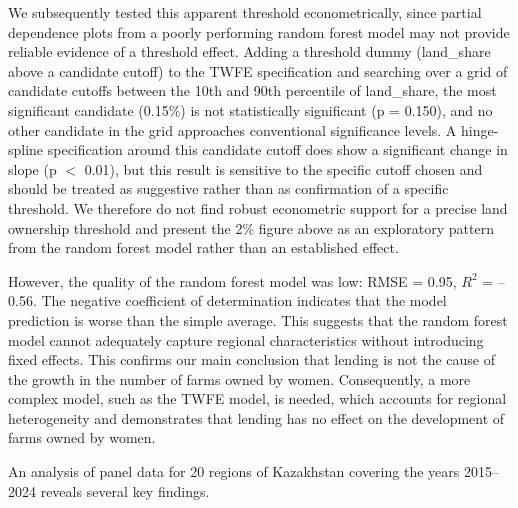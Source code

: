 ﻿\documentclass[pdflatex,sn-mathphys-ay]{sn-jnl}
\newif\ifrevmarks
\newcommand{\rev}[1]{\ifrevmarks\textcolor{red}{#1}\else#1\fi}
\begin{document}
\rev{We subsequently tested this apparent threshold econometrically,
since partial dependence plots from a poorly performing random forest
model may not provide reliable evidence of a threshold effect. Adding a
threshold dummy (land\_share above a candidate cutoff) to the TWFE
specification and searching over a grid of candidate cutoffs between
the 10th and 90th percentile of land\_share, the most significant
candidate (0.15\%) is not statistically significant (p = 0.150), and no
other candidate in the grid approaches conventional significance
levels. A hinge-spline specification around this candidate cutoff does
show a significant change in slope (p $<$ 0.01), but this result is
sensitive to the specific cutoff chosen and should be treated as
suggestive rather than as confirmation of a specific threshold. We
therefore do not find robust econometric support for a precise land
ownership threshold and present the 2\% figure above as an exploratory
pattern from the random forest model rather than an established
effect.}

However, the quality of the random forest model was low: RMSE = 0.95, $R^2$
= --0.56. The negative coefficient of determination indicates that the
model prediction is worse than the simple average. This suggests that the
random forest model cannot adequately capture regional characteristics
without introducing fixed effects. This confirms our main conclusion
that lending is not the cause of the growth in the number of farms owned
by women. Consequently, a more complex model, such
as the TWFE model, is needed, which accounts for regional heterogeneity
and demonstrates that lending has no effect on the development of farms
owned by women.

An analysis of panel data for 20 regions of Kazakhstan covering the
years 2015--2024 reveals several key findings.
\end{document}
